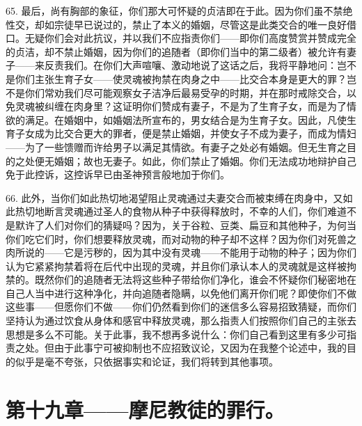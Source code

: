 65. 最后，尚有胸部的象征，你们那大可怀疑的贞洁即在于此。因为你们虽不禁绝性交，却如宗徒早已说过的，禁止了本义的婚姻，尽管这是此类交合的唯一良好借口。无疑你们会对此抗议，并以我们不应指责你们——即你们高度赞赏并赞成完全的贞洁，却不禁止婚姻，因为你们的追随者（即你们当中的第二级者）被允许有妻子——来反责我们。在你们大声喧嚷、激动地说了这话之后，我将平静地问：岂不是你们主张生育子女——使灵魂被拘禁在肉身之中——比交合本身是更大的罪？岂不是你们常劝我们尽可能观察女子洁净后最易受孕的时期，并在那时戒除交合，以免灵魂被纠缠在肉身里？这证明你们赞成有妻子，不是为了生育子女，而是为了情欲的满足。在婚姻中，如婚姻法所宣布的，男女结合是为生育子女。因此，凡使生育子女成为比交合更大的罪者，便是禁止婚姻，并使女子不成为妻子，而成为情妇——为了一些馈赠而许给男子以满足其情欲。有妻子之处必有婚姻。但无生育之目的之处便无婚姻；故也无妻子。如此，你们禁止了婚姻。你们无法成功地辩护自己免于此控诉，这控诉早已由圣神预言般地加于你们。\par

66. 此外，当你们如此热切地渴望阻止灵魂通过夫妻交合而被束缚在肉身中，又如此热切地断言灵魂通过圣人的食物从种子中获得释放时，不幸的人们，你们难道不是默许了人们对你们的猜疑吗？\newline{}因为，关于谷粒、豆类、扁豆和其他种子，为何当你们吃它们时，你们想要释放灵魂，而对动物的种子却不这样？\newline{}因为你们对死兽之肉所说的——它是污秽的，因为其中没有灵魂——不能用于动物的种子；因为你们认为它紧紧拘禁着将在后代中出现的灵魂，并且你们承认本人的灵魂就是这样被拘禁的。\newline{}既然你们的追随者无法将这些种子带给你们净化，谁会不怀疑你们秘密地在自己人当中进行这种净化，并向追随者隐瞒，以免他们离开你们呢？\newline{}即使你们不做这些事——但愿你们不做——你们仍然看到你们的迷信多么容易招致猜疑，而你们坚持认为通过饮食从身体和感官中释放灵魂，那么指责人们按照你们自己的主张去思想是多么不可能。\newline{}关于此事，我不想再多说什么：你们自己看到这里有多少可指责之处。但由于此事宁可被抑制也不应招致议论，又因为在我整个论述中，我的目的似乎是毫不夸张，只依据事实和论证，我们将转到其他事项。\par


\section{第十九章——摩尼教徒的罪行。}

